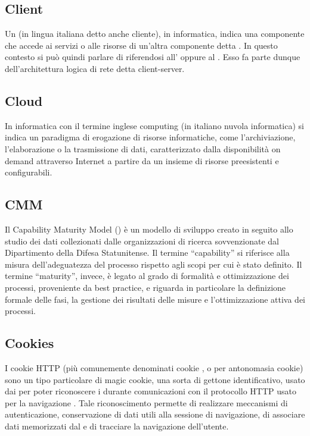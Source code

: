\subsection{Client}
Un  (in lingua italiana detto anche cliente), in informatica, indica una componente che accede ai servizi o alle risorse di un'altra componente detta . In questo contesto si può quindi parlare di  riferendosi all' oppure al . Esso fa parte dunque dell'architettura logica di rete detta client-server.

\subsection{Cloud}
In informatica con il termine inglese  computing (in italiano nuvola informatica) si indica un paradigma di erogazione di risorse informatiche, come l'archiviazione, l'elaborazione o la trasmissione di dati, caratterizzato dalla disponibilità on demand attraverso Internet a partire da un insieme di risorse preesistenti e configurabili.

\subsection{CMM}
Il Capability Maturity Model () è un modello di sviluppo creato in seguito allo
studio dei dati collezionati dalle organizzazioni di ricerca sovvenzionate dal Dipartimento
della Difesa Statunitense. Il termine “capability” si riferisce alla misura dell’adeguatezza
del processo rispetto agli scopi per cui è stato definito. Il termine “maturity”, invece, è
legato al grado di formalità e ottimizzazione dei processi, proveniente da best practice, e
riguarda in particolare la definizione formale delle fasi, la gestione dei risultati delle misure
e l’ottimizzazione attiva dei processi.

\subsection{Cookies}
I cookie HTTP (più comunemente denominati cookie , o per antonomasia cookie) sono un tipo particolare di magic cookie, una sorta di gettone identificativo, usato dai   per poter riconoscere i  durante comunicazioni con il protocollo HTTP usato per la navigazione . Tale riconoscimento permette di realizzare meccanismi di autenticazione, conservazione di dati utili alla sessione di navigazione, di associare dati memorizzati dal  e di tracciare la navigazione dell'utente.


